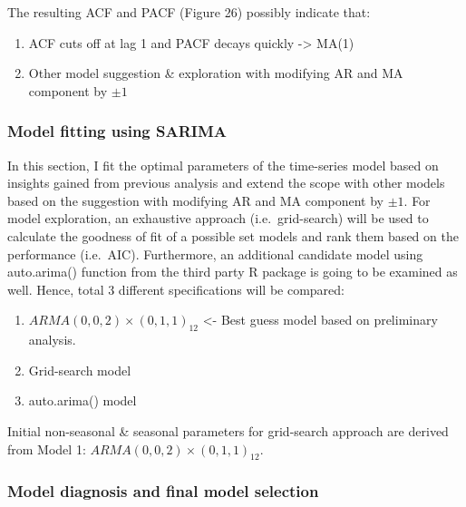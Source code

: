 \documentclass[
  11pt,
]{article}
\providecommand{\tightlist}{%
  \setlength{\itemsep}{0pt}\setlength{\parskip}{0pt}}
\begin{document}
The resulting ACF and PACF (Figure 26) possibly indicate that:

\begin{enumerate}
\def\labelenumi{\arabic{enumi}.}
\tightlist
\item
  ACF cuts off at lag 1 and PACF decays quickly -\textgreater{} MA(1)
\item
  Other model suggestion \& exploration with modifying AR and MA
  component by \(\pm1\)
\end{enumerate}

\newpage

\hypertarget{model-fitting-using-sarima-2}{%
\subsubsection{Model fitting using
SARIMA}\label{model-fitting-using-sarima-2}}

In this section, I fit the optimal parameters of the time-series model
based on insights gained from previous analysis and extend the scope
with other models based on the suggestion with modifying AR and MA
component by \(\pm1\). For model exploration, an exhaustive approach
(i.e.~grid-search) will be used to calculate the goodness of fit of a
possible set models and rank them based on the performance (i.e.~AIC).
Furthermore, an additional candidate model using auto.arima() function
from the third party R package is going to be examined as well. Hence,
total 3 different specifications will be compared:

\begin{enumerate}
\def\labelenumi{\arabic{enumi}.}
\tightlist
\item
  \(ARMA(0,0,2)\times(0,1,1)_{12}\) \textless- Best guess model based on
  preliminary analysis.
\item
  Grid-search model
\item
  auto.arima() model
\end{enumerate}

Initial non-seasonal \& seasonal parameters for grid-search approach are
derived from Model 1: \(ARMA(0,0,2)\times(0,1,1)_{12}\).

\newpage

\hypertarget{model-diagnosis-and-final-model-selection-2}{%
\subsubsection{Model diagnosis and final model
selection}\label{model-diagnosis-and-final-model-selection-2}}
\end{document}
